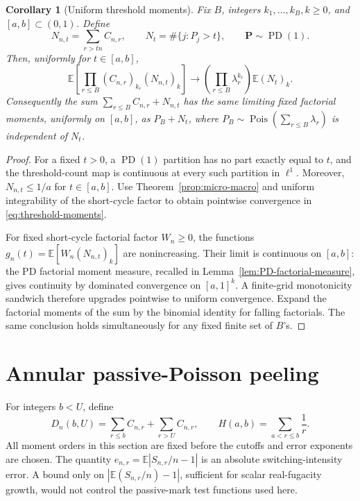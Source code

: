 \documentclass[11pt]{article}
\numberwithin{equation}{section}
\newcommand{\E}{\mathbb E}
\newcommand{\Pois}{\operatorname{Pois}}
\newcommand{\PD}{\operatorname{PD}}
\newtheorem{corollary}[theorem]{Corollary}
\theoremstyle{definition}
\theoremstyle{remark}
\begin{document}
\begin{corollary}[Uniform threshold moments]\label{cor:threshold-joint}
Fix $B$, integers $k_1,\ldots,k_B,k\ge0$, and
$[a,b]\subset(0,1)$.  Define
\[
 N_{n,t}=\sum_{r>tn}C_{n,r},\qquad
 N_t=\#\{j:P_j>t\},\qquad\mathbf P\sim\PD(1).
\]
Then, uniformly for $t\in[a,b]$,
\begin{equation}\label{eq:threshold-moments}
 \E\left[\prod_{r\le B}(C_{n,r})_{k_r}(N_{n,t})_k\right]
 \longrightarrow
 \left(\prod_{r\le B}\lambda_r^{k_r}\right)\E(N_t)_k.
\end{equation}
Consequently the sum $\sum_{r\le B}C_{n,r}+N_{n,t}$ has the same limiting
fixed factorial moments, uniformly on $[a,b]$, as $P_B+N_t$, where
$P_B\sim\Pois(\sum_{r\le B}\lambda_r)$ is independent of $N_t$.
\end{corollary}
\begin{proof}
For a fixed $t>0$, a $\PD(1)$ partition has no part exactly equal to $t$,
and the threshold-count map is continuous at every such partition in
$\ell^1$.  Moreover, $N_{n,t}\le1/a$ for $t\in[a,b]$.
Use Theorem~\ref{prop:micro-macro} and uniform integrability of the short-cycle
factor to obtain pointwise convergence in \eqref{eq:threshold-moments}.

For fixed short-cycle factorial factor $W_n\ge0$, the functions
$g_n(t)=\E[W_n(N_{n,t})_k]$ are nonincreasing.  Their limit is continuous
on $[a,b]$: the PD factorial moment measure, recalled in
Lemma~\ref{lem:PD-factorial-measure}, gives continuity by dominated convergence
on $[a,1]^k$.  A finite-grid monotonicity sandwich therefore upgrades
pointwise to uniform convergence.  Expand the factorial moments of the
sum by the binomial identity for falling factorials.  The same conclusion
holds simultaneously for any fixed finite set of $B$'s.
\end{proof}

\section{Annular passive-Poisson peeling}\label{sec:peeling}

For integers $b<U$, define
\[
 D_n(b,U)=\sum_{r\le b}C_{n,r}+\sum_{r>U}C_{n,r},\qquad
 H(a,b)=\sum_{a<r\le b}\frac1r.
\]
All moment orders in this section are fixed before the cutoffs and error
exponents are chosen.  The quantity $e_{n,r}=\E|S_{n,r}/n-1|$ is an
absolute switching-intensity error.  A bound only on
$|\E(S_{n,r}/n)-1|$, sufficient for scalar real-fugacity growth, would not
control the passive-mark test functions used here.
\end{document}
